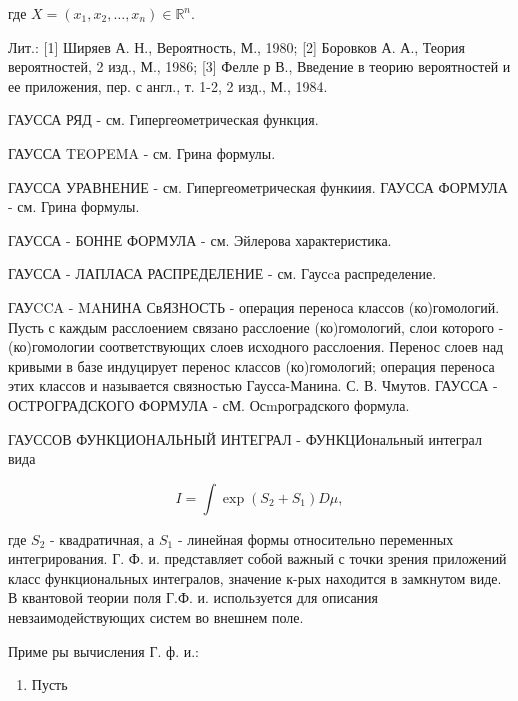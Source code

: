 \documentclass[10pt]{article}
\begin{document}
где $X=\left(x_{1}, x_{2}, \ldots, x_{n}\right) \in \mathbb{R}^{n}$.



Лит.: [1] Ширяев А. Н., Вероятность, М., 1980; [2] Боровков А. А., Теория вероятностей, 2 изд., М., 1986; [3] Фелле р В., Введение в теорию вероятностей и ее приложения, пер. с англ., т. 1-2, 2 изд., М., 1984.



ГАУССА РЯД - см. Гипергеометрическая функция.



ГАУССА TEOPEMA - см. Грина формулы.



ГАУССА УРАВНЕНИЕ - см. Гипергеометрическая функиия. ГАУССА ФОРМУЛА - см. Грина формулы.



ГАУССА - БОННЕ ФОРМУЛА - см. Эйлерова характеристика.



ГАУССА - ЛАПЛАСА РАСПРЕДЕЛЕНИЕ - см. Гаусcа распределение.



ГАУCCA - MAНИНА СвЯЗНОСТЬ - операция переноса классов (ко)гомологий. Пусть с каждым расслоением связано расслоение (ко)гомологий, слои которого - (ко)гомологии соответствующих слоев исходного расслоения. Перенос слоев над кривыми в базе индуцирует перенос классов (ко)гомологий; операция переноса этих классов и называется связностью Гаусса-Манина. С. В. Чмутов. ГАУССА - ОСТРОГРАДСКОГО ФОРМУЛА - сМ. Осmроградского формула.



ГАУССОВ ФУНКЦИОНАЛЬНЫЙ ИНТЕГРАЛ - ФУНКЦИональный интеграл вида



\[

I=\int \exp \left(S_{2}+S_{1}\right) D \mu,

\]



где $S_{2}$ - квадратичная, а $S_{1}$ - линейная формы относительно переменных интегрирования. Г. Ф. и. представляет собой важный с точки зрения приложений класс функциональных интегралов, значение к-рых находится в замкнутом виде. В квантовой теории поля Г.Ф. и. используется для описания невзаимодействующих систем во внешнем поле.



Приме ры вычисления Г. ф. и.:



\begin{enumerate}

  \item Пусть

\end{enumerate}
\end{document}
